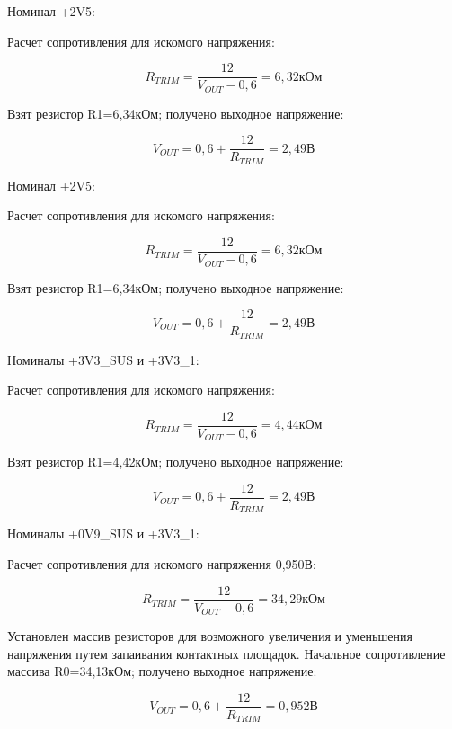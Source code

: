 Номинал +2V5:

Расчет сопротивления для искомого напряжения:

\begin{equation}
R_{TRIM} = \frac{12}{V_{OUT}-0,6} = 6,32\text{кОм}
\end{equation}

Взят резистор R1=6,34кОм; получено выходное напряжение:

\begin{equation}
V_{OUT} = 0,6 + \frac{12}{R_{TRIM}} = 2,49\text{В}
\end{equation}

Номинал +2V5:

Расчет сопротивления для искомого напряжения:

\begin{equation}
R_{TRIM} = \frac{12}{V_{OUT}-0,6} = 6,32\text{кОм}
\end{equation}

Взят резистор R1=6,34кОм; получено выходное напряжение:

\begin{equation}
V_{OUT} = 0,6 + \frac{12}{R_{TRIM}} = 2,49\text{В}
\end{equation}

Номиналы +3V3\_SUS и +3V3\_1:

Расчет сопротивления для искомого напряжения:

\begin{equation}
R_{TRIM} = \frac{12}{V_{OUT}-0,6} = 4,44\text{кОм}
\end{equation}

Взят резистор R1=4,42кОм; получено выходное напряжение:

\begin{equation}
V_{OUT} = 0,6 + \frac{12}{R_{TRIM}} = 2,49\text{В}
\end{equation}

Номиналы +0V9\_SUS и +3V3\_1:

Расчет сопротивления для искомого напряжения 0,950В:

\begin{equation}
R_{TRIM} = \frac{12}{V_{OUT}-0,6} = 34,29\text{кОм}
\end{equation}


Установлен массив резисторов для возможного увеличения и уменьшения напряжения путем запаивания контактных площадок.
Начальное сопротивление массива R0=34,13кОм; получено выходное напряжение:

\begin{equation}
V_{OUT} = 0,6 + \frac{12}{R_{TRIM}} = 0,952\text{В}
\end{equation}


